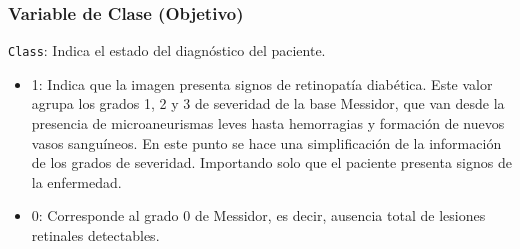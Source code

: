 \subsubsection{Variable de Clase (Objetivo)}

\texttt{Class}: Indica el estado del diagnóstico del paciente.
\begin{itemize}
    \item 1: Indica que la imagen presenta signos de retinopatía diabética. Este valor agrupa los grados 1, 2 y 3 de severidad de la base Messidor, que van desde la presencia de microaneurismas leves hasta hemorragias y formación de nuevos vasos sanguíneos. En este punto se hace una simplificación de la información de los grados de severidad. Importando solo que el paciente presenta signos de la enfermedad.
    \item 0: Corresponde al grado 0 de Messidor, es decir, ausencia total de lesiones retinales detectables.
\end{itemize}
